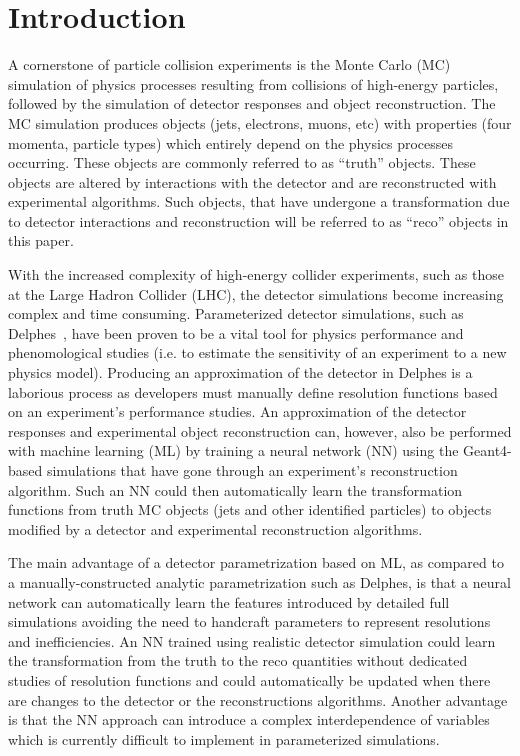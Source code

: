 \documentclass[showpacs,showkeys,preprint,prd,nofootinbib,linenumbers,12pt,superscriptaddress]{revtex4-1}
\begin{document}
\maketitle

\section{Introduction}
\label{sec:intro}
A cornerstone of particle collision experiments is the Monte Carlo (MC) simulation of physics processes resulting from collisions of high-energy particles, followed by the simulation of detector responses and object reconstruction. The MC simulation produces objects (jets, electrons, muons, etc) with properties (four momenta, particle types) which entirely depend on the physics processes occurring. These objects are commonly referred to as ``truth'' objects. These objects are altered by interactions with the detector and are reconstructed with experimental algorithms. Such objects, that have undergone a transformation due to detector interactions and reconstruction will be referred to as ``reco'' objects in this paper.

With the increased complexity of high-energy collider experiments, such as those at the Large Hadron Collider (LHC), the detector simulations become increasing complex and time consuming. Parameterized detector simulations, such as Delphes~\cite{deFavereau:2013fsa}, have been proven to be a vital tool for physics performance and phenomological studies (i.e. to estimate the sensitivity of an experiment to a new physics model). Producing an approximation of the detector in Delphes is a laborious process as developers must manually define resolution functions based on an experiment's performance studies. An approximation of the detector responses and experimental object reconstruction can, however, also be performed with machine learning (ML) by training a neural network (NN) using the Geant4-based simulations that have gone through an experiment's reconstruction algorithm. Such an NN could then automatically learn the transformation functions from truth MC objects (jets and other identified particles) to objects modified by a detector and experimental reconstruction algorithms. 

The main advantage of a detector parametrization based on ML, as compared to a manually-constructed analytic parametrization such as Delphes, is that a neural network can automatically learn the features introduced by detailed full simulations avoiding the need to handcraft parameters to represent resolutions and inefficiencies. An NN trained using realistic detector simulation could learn the transformation from the truth to the reco quantities without dedicated studies of resolution functions and could automatically be updated when there are changes to the detector or the reconstructions algorithms. Another advantage is that the NN approach can introduce a complex interdependence of variables which is currently difficult to implement in parameterized simulations.
\end{document}
